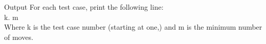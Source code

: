 Output
For each test case, print the following line:
\\k. m
\\Where k is the test case number (starting at one,) and m is the minimum number of moves.